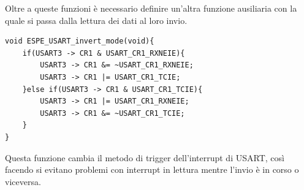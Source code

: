 Oltre a queste funzioni è necessario definire un'altra funzione ausiliaria con la quale si passa dalla lettura dei dati al loro invio.\\

\noindent
\begin{verbatim}
void ESPE_USART_invert_mode(void){
    if(USART3 -> CR1 & USART_CR1_RXNEIE){
        USART3 -> CR1 &= ~USART_CR1_RXNEIE;
        USART3 -> CR1 |= USART_CR1_TCIE;
    }else if(USART3 -> CR1 & USART_CR1_TCIE){
        USART3 -> CR1 |= USART_CR1_RXNEIE;
        USART3 -> CR1 &= ~USART_CR1_TCIE;
    }
}
\end{verbatim}

Questa funzione cambia il metodo di trigger dell'interrupt di USART, così facendo si evitano problemi con interrupt in lettura mentre l'invio è in corso o viceversa.\\



